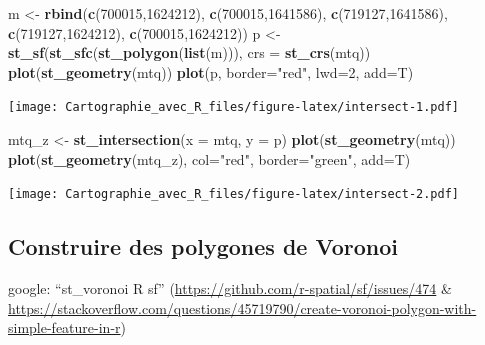 \documentclass[]{book}
\newenvironment{Shaded}{\begin{snugshade}}{\end{snugshade}}
\newcommand{\KeywordTok}[1]{\textcolor[rgb]{0.13,0.29,0.53}{\textbf{#1}}}
\newcommand{\DataTypeTok}[1]{\textcolor[rgb]{0.13,0.29,0.53}{#1}}
\newcommand{\DecValTok}[1]{\textcolor[rgb]{0.00,0.00,0.81}{#1}}
\newcommand{\StringTok}[1]{\textcolor[rgb]{0.31,0.60,0.02}{#1}}
\newcommand{\NormalTok}[1]{#1}
\begin{document}
\begin{Shaded}
\begin{Highlighting}[]
\NormalTok{m <-}\StringTok{ }\KeywordTok{rbind}\NormalTok{(}\KeywordTok{c}\NormalTok{(}\DecValTok{700015}\NormalTok{,}\DecValTok{1624212}\NormalTok{), }\KeywordTok{c}\NormalTok{(}\DecValTok{700015}\NormalTok{,}\DecValTok{1641586}\NormalTok{), }\KeywordTok{c}\NormalTok{(}\DecValTok{719127}\NormalTok{,}\DecValTok{1641586}\NormalTok{), }\KeywordTok{c}\NormalTok{(}\DecValTok{719127}\NormalTok{,}\DecValTok{1624212}\NormalTok{), }\KeywordTok{c}\NormalTok{(}\DecValTok{700015}\NormalTok{,}\DecValTok{1624212}\NormalTok{))}
\NormalTok{p <-}\StringTok{ }\KeywordTok{st_sf}\NormalTok{(}\KeywordTok{st_sfc}\NormalTok{(}\KeywordTok{st_polygon}\NormalTok{(}\KeywordTok{list}\NormalTok{(m))), }\DataTypeTok{crs =} \KeywordTok{st_crs}\NormalTok{(mtq))}
\KeywordTok{plot}\NormalTok{(}\KeywordTok{st_geometry}\NormalTok{(mtq))}
\KeywordTok{plot}\NormalTok{(p, }\DataTypeTok{border=}\StringTok{"red"}\NormalTok{, }\DataTypeTok{lwd=}\DecValTok{2}\NormalTok{, }\DataTypeTok{add=}\NormalTok{T)}
\end{Highlighting}
\end{Shaded}

\texttt{[image: Cartographie\_avec\_R\_files/figure-latex/intersect-1.pdf]}

\begin{Shaded}
\begin{Highlighting}[]
\NormalTok{mtq_z <-}\StringTok{ }\KeywordTok{st_intersection}\NormalTok{(}\DataTypeTok{x =}\NormalTok{ mtq, }\DataTypeTok{y =}\NormalTok{ p)}
\KeywordTok{plot}\NormalTok{(}\KeywordTok{st_geometry}\NormalTok{(mtq))}
\KeywordTok{plot}\NormalTok{(}\KeywordTok{st_geometry}\NormalTok{(mtq_z), }\DataTypeTok{col=}\StringTok{"red"}\NormalTok{, }\DataTypeTok{border=}\StringTok{"green"}\NormalTok{, }\DataTypeTok{add=}\NormalTok{T)}
\end{Highlighting}
\end{Shaded}

\texttt{[image: Cartographie\_avec\_R\_files/figure-latex/intersect-2.pdf]}

\subsection{Construire des polygones de
Voronoi}\label{construire-des-polygones-de-voronoi}

google: ``st\_voronoi R sf''
(\url{https://github.com/r-spatial/sf/issues/474} \&
\url{https://stackoverflow.com/questions/45719790/create-voronoi-polygon-with-simple-feature-in-r})
\end{document}
